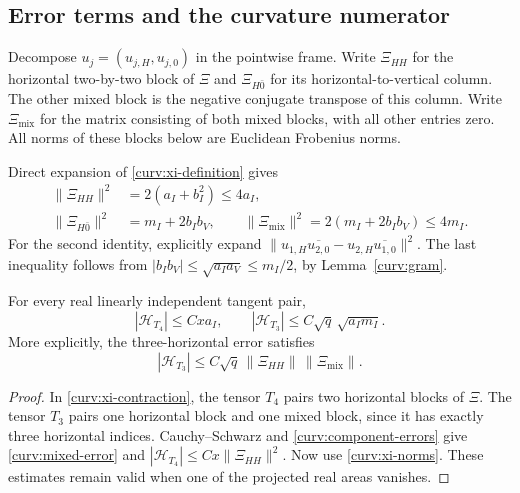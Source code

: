 \subsection{Error terms and the curvature numerator}

Decompose $u_j=(u_{j,H},u_{j,0})$ in the pointwise frame.
Write $\Xi_{HH}$ for the horizontal two-by-two block of $\Xi$
and $\Xi_{H\bar0}$ for its horizontal-to-vertical column.
The other mixed block is the negative conjugate transpose of this
column.  Write $\Xi_{\mathrm{mix}}$ for the matrix consisting of
both mixed blocks, with all other entries zero.
All norms of these blocks below are Euclidean Frobenius norms.

Direct expansion of \eqref{curv:xi-definition} gives
\begin{equation}\label{curv:xi-norms}
 \begin{aligned}
 \|\Xi_{HH}\|^2&=2(a_I+b_I^2)\le4a_I,\\
 \|\Xi_{H\bar0}\|^2&=m_I+2b_Ib_V,\qquad
 \|\Xi_{\mathrm{mix}}\|^2=2(m_I+2b_Ib_V)\le4m_I.
 \end{aligned}
\end{equation}
For the second identity, explicitly expand
$\|u_{1,H}\overline{u_{2,0}}
      -u_{2,H}\overline{u_{1,0}}\|^2$.
The last inequality follows from
$|b_Ib_V|\le\sqrt{a_Ia_V}\le m_I/2$,
by Lemma~\ref{curv:gram}.

\begin{lemma}\label{curv:errors}
For every real linearly independent tangent pair,
\begin{equation}\label{curv:contracted-errors}
 |\mathcal H_{T_4}|\le Cx a_I,\qquad
 |\mathcal H_{T_3}|\le C\sqrt q\,\sqrt{a_I m_I}.
\end{equation}
More explicitly, the three-horizontal error satisfies
\begin{equation}\label{curv:mixed-error}
 |\mathcal H_{T_3}|
   \le C\sqrt q\,\|\Xi_{HH}\|\,
                         \|\Xi_{\mathrm{mix}}\|.
\end{equation}
\end{lemma}

\begin{proof}
In \eqref{curv:xi-contraction}, the tensor $T_4$ pairs two
horizontal blocks of $\Xi$.  The tensor $T_3$ pairs one horizontal
block and one mixed block, since it has exactly three horizontal
indices.  Cauchy--Schwarz and \eqref{curv:component-errors} give
\eqref{curv:mixed-error} and
$|\mathcal H_{T_4}|\le Cx\|\Xi_{HH}\|^2$.
Now use \eqref{curv:xi-norms}.  These estimates remain valid when
one of the projected real areas vanishes.
\end{proof}

